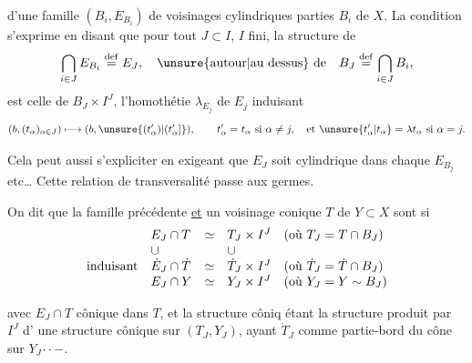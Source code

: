  d'une famille 
$(B_i,E_{B_i})$ de voisinages cylindriques  parties $B_i$ de $X$.
La condition s'exprime en disant que pour
tout $J\subset I$, $I$ fini, la structure de
\[
\bigcap_{i\in J}E_{B_i}\overset{\mathrm{def}}=E_J,
\quad\text{\unsure{autour|au dessus} de}\quad
B_J\overset{\mathrm{def}}=\bigcap_{i\in J}B_i,
\]
est celle de $B_J\times I^J$, l'homothétie
$\lambda_{E_j}$ de $E_j$  induisant
\[
(b,(t_\alpha)_{\alpha\in J})\longmapsto(b,\unsure{(t'_\alpha)|(t'_\alpha]}),
\qquad
t'_\alpha=t_\alpha\ \text{si }\alpha\ne j,\quad
\text{et }\unsure{t'_\alpha|t_\alpha}=\lambda t_\alpha\ \text{si }\alpha=j.
\]

Cela peut aussi s'expliciter en exigeant
que $E_J$ soit cylindrique dans chaque $E_{B_j}$ etc\ldots
Cette relation de transversalité passe aux germes.

On dit que la famille précédente \uline{et}
un voisinage conique $T$ de $Y\subset X$ sont
 
si 
\[
\begin{array}{l@{\quad}lcl@{\quad}l}
& E_J\cap T & \simeq & T_J\times I^J
& (\text{où }T_J=T\cap B_J)\\
&\cup&&\cup&\\
\text{induisant}&\dot E_J\cap\dot T&\simeq&\dot T_J\times I^J
&(\text{où }\dot T_J=\dot T\cap B_J)\\
&E_J\cap Y&\simeq&Y_J\times I^J
&(\text{où }Y_J=Y\sim B_J)
\end{array}
\]

avec $E_J\cap T$ cônique dans $T$, et la structure côniq
 étant la structure produit par $I^J$ d'
une structure cônique sur $(T_J,Y_J)$, ayant
$\dot T_J$ comme partie-bord du cône sur $Y_J$\(\mathinner{\cdotp\cdotp-}\).


